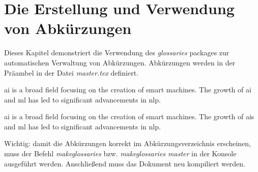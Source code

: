 
\section{Die Erstellung und Verwendung von Abkürzungen} \label{chap:abbreviations}
Dieses Kapitel demonstriert die Verwendung des \emph{glossaries} packages zur automatischen Verwaltung von Abkürzungen. Abkürzungen werden in der Präambel in der Datei \emph{master.tex} definiert.

\gls{ai} is a broad field focusing on the creation of smart machines. The growth of \gls{ai} and \gls{ml} has led to significant advancements in \gls{nlp}.

\gls{ai} is a broad field focusing on the creation of smart machines. The growth of \glspl{ai} and \gls{ml} has led to significant advancements in \gls{nlp}.


Wichtig: damit die Abkürzungen korrekt im Abkürzungsverzeichnis erscheinen, muss der Befehl \emph{makeglossaries} bzw. \emph{makeglossaries master} in der Konsole ausgeführt werden. Anschließend muss das Dokument neu kompiliert werden.
